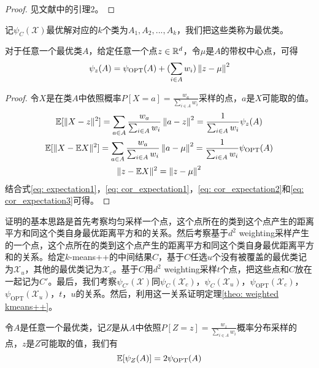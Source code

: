 \begin{proof}
    见文献\cite{Dasgupta_kmeans}中的引理2。
\end{proof}
记$\psi_{C}(\mathcal{X})$最优解对应的$k$个类为$A_1,A_2,...,A_k$，我们把这些类称为最优类。
\begin{corollary}
    \label{cor: expectation}
    对于任意一个最优类$A$，给定任意一个点$z \in \mathbb{R}^d$，令$\mu$是$A$的带权中心点，可得
    \begin{equation}
        \psi_z(A) = \psi_{\text{OPT}}(A) + (\sum_{i \in A}w_i) \left\lVert z-\mu\right\rVert^2
    \end{equation}
\end{corollary}
\begin{proof}
    令$X$是在类$A$中依照概率$P[X=a] = \frac{w_a}{\sum_{i \in A} w_i}$采样的点，$a$是$X$可能取的值。
    \begin{gather}
        \mathbb{E}[\|X-z\|^{2}] = \sum_{a \in A} \frac{w_a}{\sum_{i \in A} w_i} \left\lVert a-z\right\rVert^2 = \frac{1}{\sum_{i \in A} w_i} \psi_z(A) \label{eq: cor_expectation1} \\
        \mathbb{E}[\|X-\mathbb{E} X\|^{2}] = \sum_{a \in A} \frac{w_a}{\sum_{i \in A} w_i} \left\lVert a-\mu\right\rVert^2 = \frac{1}{\sum_{i \in A} w_i} \psi_{\text{OPT}}(A) \label{eq: cor_expectation2}\\
        \|z-\mathbb{E} X\|^{2} = \left\lVert z-\mu\right\rVert^2 \label{eq: cor_expectation3}
    \end{gather}
    结合式\ref{eq: expectation1}，\ref{eq: cor_expectation1}，\ref{eq: cor_expectation2}和\ref{eq: cor_expectation3}可得。
\end{proof}
证明的基本思路是首先考察均匀采样一个点，这个点所在的类到这个点产生的距离平方和同这个类自身最优距离平方和的关系。然后考察基于$d^2$ weighting采样产生的一个点，这个点所在的类到这个点产生的距离平方和同这个类自身最优距离平方和的关系。给定$k$-means++的中间结果$C$，基于$C$任选$u$个没有被覆盖的最优类记为$\mathcal{X}_u$，其他的最优类记为$\mathcal{X}_c$。基于$C$用$d^2$ weighting采样$t$个点，把这些点和$C$放在一起记为$C'$。最后，我们考察$\psi_{C'}(\mathcal{X})$同$\psi_{C}(\mathcal{X}_c)$，$\psi_{C}(\mathcal{X}_u)$，$\psi_{\text{OPT}}(\mathcal{X}_c)$，$\psi_{\text{OPT}}(\mathcal{X}_u)$，$t$，$u$的关系。然后，利用这一关系证明定理\ref{theo: weighted kmeans++}。
\begin{lemma}
    \label{lem: 2OPT_A}
    令$A$是任意一个最优类，记$Z$是从$A$中依照$P[Z = z] = \frac{w_z}{\sum_{i \in A} w_i}$概率分布采样的点，$z$是$Z$可能取的值，我们有
    \begin{equation}
        \mathbb{E}[\psi_Z(A)] = 2 \psi_{\text{OPT}}(A)
    \end{equation}
\end{lemma}
